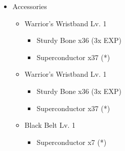 \begin{paracol}{2}
\begin{upgrade}
\begin{itemize}
\begin{itemize}
				      \item Accessories
				            \begin{itemize}
					            \item Warrior's Wristband Lv. 1
					                  \begin{itemize}
						                  \item Sturdy Bone x36 (3x EXP)
						                  \item Superconductor x37 (*)
					                  \end{itemize}
					            \item Warrior's Wristband Lv. 1
					                  \begin{itemize}
						                  \item Sturdy Bone x36 (3x EXP)
						                  \item Superconductor x37 (*)
					                  \end{itemize}
					            \item Black Belt Lv. 1
					                  \begin{itemize}
						                  \item Superconductor x7 (*)
					                  \end{itemize}
				            \end{itemize}
			      \end{itemize}
		\end{itemize}


\end{upgrade}
\end{paracol}
